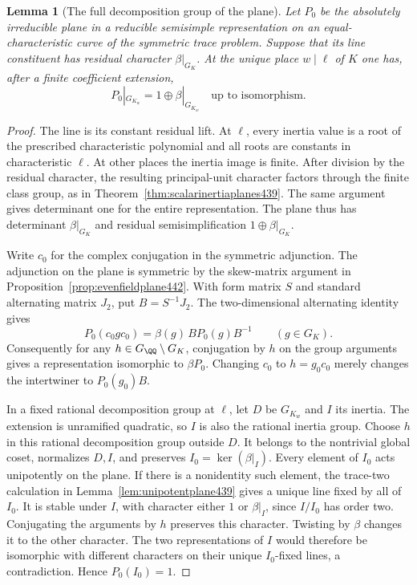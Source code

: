 \documentclass[a4paper,11pt]{article}
\newtheorem{lemma}[proposition]{Lemma}
\theoremstyle{definition}
\theoremstyle{remark}
\numberwithin{equation}{section}
\begin{document}
\begin{lemma}[The full decomposition group of the plane]\leavevmode
\label{lem:inertplane443}
Let \(P_0\) be the absolutely irreducible plane in a reducible
semisimple representation on an equal-characteristic curve of
the symmetric trace problem. Suppose that its line constituent
has residual character \(\beta|_{G_K}\). At the unique place
\(w\mid\ell\) of \(K\) one has, after a finite coefficient extension,
\[
                   P_0|_{G_{K_w}}=1\oplus\beta|_{G_{K_w}}
                     \quad\text{up to isomorphism}.
\]
\end{lemma}
\begin{proof}
The line is its constant residual lift. At \(\ell\), every inertia
value is a root of the prescribed characteristic polynomial and
all roots are constants in characteristic \(\ell\). At other places
the inertia image is finite. After division by the residual
character, the resulting principal-unit character factors through
the finite class group, as in Theorem~\ref{thm:scalarinertiaplanes439}.
The same argument gives determinant one for the entire
representation. The plane thus has determinant \(\beta|_{G_K}\)
and residual semisimplification \(1\oplus\beta|_{G_K}\).

Write \(c_0\) for the complex conjugation in the symmetric
adjunction. The adjunction on the plane is symmetric by the
skew-matrix argument in Proposition~\ref{prop:evenfieldplane442}.
With form matrix \(S\) and standard alternating matrix \(J_2\), put
\(B=S^{-1}J_2\). The two-dimensional alternating identity gives
\[
        P_0(c_0 g c_0)=\beta(g)\,B P_0(g)B^{-1}\qquad(g\in G_K).
\]
Consequently for any \(h\in G_\QQ\setminus G_K\), conjugation by
\(h\) on the group arguments gives a representation isomorphic to
\(\beta P_0\). Changing \(c_0\) to \(h=g_0c_0\) merely changes
the intertwiner to \(P_0(g_0)B\).

In a fixed rational decomposition group at \(\ell\), let \(D\)
be \(G_{K_w}\) and \(I\) its inertia. The extension is unramified
quadratic, so \(I\) is also the rational inertia group. Choose
\(h\) in this rational decomposition group outside \(D\).
It belongs to the nontrivial global coset, normalizes \(D,I\),
and preserves \(I_0=\ker(\beta|_I)\). Every element of \(I_0\)
acts unipotently on the plane. If there is a nonidentity such
element, the trace-two calculation in
Lemma~\ref{lem:unipotentplane439} gives a unique line fixed by
all of \(I_0\). It is stable under \(I\), with character either
\(1\) or \(\beta|_I\), since \(I/I_0\) has order two. Conjugating
the arguments by \(h\) preserves this character. Twisting by
\(\beta\) changes it to the other character. The two
representations of \(I\) would therefore be isomorphic with
different characters on their unique \(I_0\)-fixed lines,
a contradiction. Hence \(P_0(I_0)=1\).


\end{proof}
\end{document}
